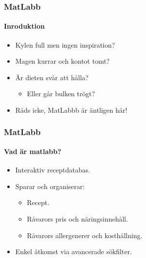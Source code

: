





\begin{frame}
  \frametitle{MatLabb}
  \framesubtitle{Inroduktion}
  \begin{itemize}
  \item<1-> Kylen full men ingen inspiration?
  \item<2-> Magen kurrar och kontot tomt?
  \item<3-> Är dieten svår att hålla?
    \begin{itemize}
    \item<4-> Eller går bulken trögt?
    \end{itemize}
  \item<5-> Räds icke, MatLabbb är äntligen här!
  \end{itemize}
\end{frame}








\begin{frame}
  \frametitle{MatLabb}
  \framesubtitle{Vad är matlabb?}
  \begin{itemize}
  \item<1-> Interaktiv receptdatabas.
  \item<2-> Sparar och organiserar:
    \begin{itemize}
    \item<2-> Recept.
    \item<3-> Råvarors pris och näringsinnehåll.
    \item<4-> Råvarors allergenerer och kosthållning.
    \end{itemize}
  \item<5-> Enkel åtkomst via avancerade sökfilter.
  \end{itemize}
\end{frame}
